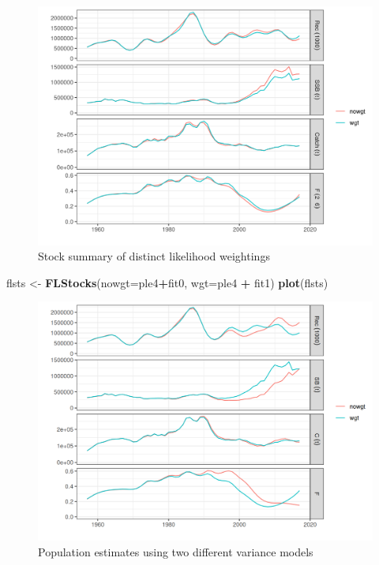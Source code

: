 \documentclass[
]{book}
\newenvironment{Shaded}{\begin{snugshade}}{\end{snugshade}}
\newcommand{\AttributeTok}[1]{\textcolor[rgb]{0.13,0.29,0.53}{#1}}
\newcommand{\FunctionTok}[1]{\textcolor[rgb]{0.13,0.29,0.53}{\textbf{#1}}}
\newcommand{\NormalTok}[1]{#1}
\newcommand{\OtherTok}[1]{\textcolor[rgb]{0.56,0.35,0.01}{#1}}
\newcommand{\SpecialCharTok}[1]{\textcolor[rgb]{0.81,0.36,0.00}{\textbf{#1}}}
\begin{document}
\begin{figure}
\centering
\includegraphics{_bookdown_files/_main_files/figure-html/likwgt-1.png}
\caption{\label{fig:likwgt}Stock summary of distinct likelihood weightings}
\end{figure}

\begin{Shaded}
\begin{Highlighting}[]
\NormalTok{flsts }\OtherTok{\textless{}{-}} \FunctionTok{FLStocks}\NormalTok{(}\AttributeTok{nowgt=}\NormalTok{ple4}\SpecialCharTok{+}\NormalTok{fit0, }\AttributeTok{wgt=}\NormalTok{ple4 }\SpecialCharTok{+}\NormalTok{ fit1)}
\FunctionTok{plot}\NormalTok{(flsts)}
\end{Highlighting}
\end{Shaded}

\begin{figure}
\centering
\includegraphics{_bookdown_files/_main_files/figure-html/likwgtimpact-1.png}
\caption{\label{fig:likwgtimpact}Population estimates using two different variance models}
\end{figure}
\end{document}
